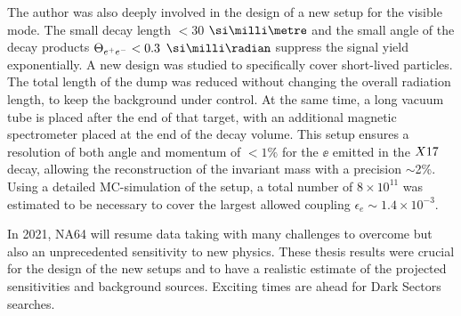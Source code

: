 The author was also deeply involved in the design of a new setup for the visible mode. The small decay length $<$30 $\mmi$ and the small angle of the decay products $\Theta_{ e^+e^-} < 0.3$ $\mrad$ suppress the signal yield exponentially. A new design was studied to specifically cover short-lived particles. The total length of the dump was reduced without changing the overall radiation length, to keep the background under control. At the same time, a long vacuum tube is placed after the end of that target, with an additional magnetic spectrometer placed at the end of the decay volume. This setup ensures a resolution of both angle and momentum of $<1\%$ for the $\ee$ emitted in the $X17$ decay, allowing the reconstruction of the invariant mass with a precision $\sim$2\%. Using a detailed MC-simulation of the setup, a total number of $8 \times 10^{11}$ was estimated to be necessary to cover the largest allowed coupling $\epsilon_e \sim 1.4 \times 10^{-3}$.

In 2021, NA64 will resume data taking with many challenges to overcome but also an unprecedented sensitivity to new physics. These thesis results were crucial for the design of the new setups and to have a realistic estimate of the projected sensitivities and background sources. Exciting times are ahead for Dark Sectors searches.


